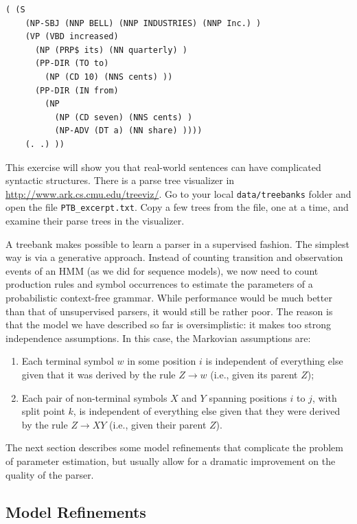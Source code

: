 \begin{verbatim}
( (S
    (NP-SBJ (NNP BELL) (NNP INDUSTRIES) (NNP Inc.) )
    (VP (VBD increased)
      (NP (PRP$ its) (NN quarterly) )
      (PP-DIR (TO to)
        (NP (CD 10) (NNS cents) ))
      (PP-DIR (IN from)
        (NP
          (NP (CD seven) (NNS cents) )
          (NP-ADV (DT a) (NN share) ))))
    (. .) ))
\end{verbatim}

\begin{exercise}\label{exer:treebank}
This exercise will show you that real-world sentences can have complicated syntactic structures. 
There is a parse tree visualizer in \url{http://www.ark.cs.cmu.edu/treeviz/}. 
Go to your local {\tt data/treebanks} folder and open the file {\tt PTB\_excerpt.txt}. 
Copy a few trees from the file, one at a time, and examine their parse trees in the visualizer.  
\end{exercise}

A treebank makes possible to learn a parser in a supervised fashion. The simplest way is via a 
generative approach. Instead of counting transition and observation events of an HMM 
(as we did for sequence models), we now need to count production rules and symbol occurrences to 
estimate the parameters of a probabilistic context-free grammar. 
While performance would be much better than that of 
unsupervised parsers, it would still be rather poor. 
The reason is that the model we have described so far is oversimplistic: 
it makes too strong independence assumptions. In this case, the Markovian assumptions are: 
\begin{enumerate}
\item Each terminal symbol $w$ in some position $i$ is independent of everything else given that it was 
derived by the rule $Z \rightarrow w$ (i.e., given its parent $Z$);
\item Each pair of non-terminal symbols $X$ and $Y$ spanning positions $i$ to $j$, with 
split point $k$, is independent of everything else given that they were derived  
by the rule $Z \rightarrow X Y$ (i.e., given their parent $Z$). 
\end{enumerate}

The next section describes some model refinements that complicate the problem of parameter estimation, 
but usually allow for a dramatic improvement on the quality of the parser.


\subsection{Model Refinements}

